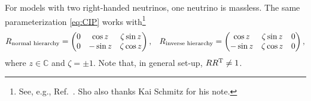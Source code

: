 \documentclass[CheatSheet]{subfiles}
\begin{document}
For models with two right-handed neutrinos, one neutrino is massless.
The same parameterization \cref{eq:CIP} works with\footnote{See, e.g., Ref.~\cite{Brdar:2019iem}. Sho also thanks Kai Schmitz for his note.}
\begin{align}
 R_{\text{normal hierarchy}}&=\begin{pmatrix}0 & \cos z & \zeta\sin z \\ 0 & -\sin z & \zeta \cos z\end{pmatrix},&
 R_{\text{inverse hierarchy}}=\begin{pmatrix}\cos z & \zeta\sin z &0 \\ -\sin z & \zeta \cos z & 0\end{pmatrix},
\end{align}
where $z\in\mathbb C$ and $\zeta=\pm1$.
Note that, in general set-up, $R R^{\mathrm{T}}\neq1$.
\end{document}
